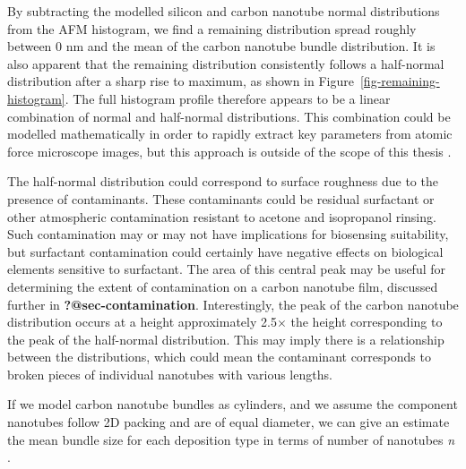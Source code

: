 \documentclass[
  a4paper,
]{scrbook}
\begin{document}
By subtracting the modelled silicon and carbon nanotube normal
distributions from the AFM histogram, we find a remaining distribution
spread roughly between 0 nm and the mean of the carbon nanotube bundle
distribution. It is also apparent that the remaining distribution
consistently follows a half-normal distribution after a sharp rise to
maximum, as shown in Figure~\ref{fig-remaining-histogram}. The full
histogram profile therefore appears to be a linear combination of normal
and half-normal distributions. This combination could be modelled
mathematically in order to rapidly extract key parameters from atomic
force microscope images, but this approach is outside of the scope of
this thesis \autocite{Alruwaili2022}.

The half-normal distribution could correspond to surface roughness due
to the presence of contaminants. These contaminants could be residual
surfactant or other atmospheric contamination resistant to acetone and
isopropanol rinsing. Such contamination may or may not have implications
for biosensing suitability, but surfactant contamination could certainly
have negative effects on biological elements sensitive to surfactant.
The area of this central peak may be useful for determining the extent
of contamination on a carbon nanotube film, discussed further in
\textbf{?@sec-contamination}. Interestingly, the peak of the carbon
nanotube distribution occurs at a height approximately 2.5\(\times\) the
height corresponding to the peak of the half-normal distribution. This
may imply there is a relationship between the distributions, which could
mean the contaminant corresponds to broken pieces of individual
nanotubes with various lengths.

If we model carbon nanotube bundles as cylinders, and we assume the
component nanotubes follow 2D packing and are of equal diameter, we can
give an estimate the mean bundle size for each deposition type in terms
of number of nanotubes \emph{n}
\autocite{Graham1998,Murugathas2018,Specht2023}.
\end{document}
